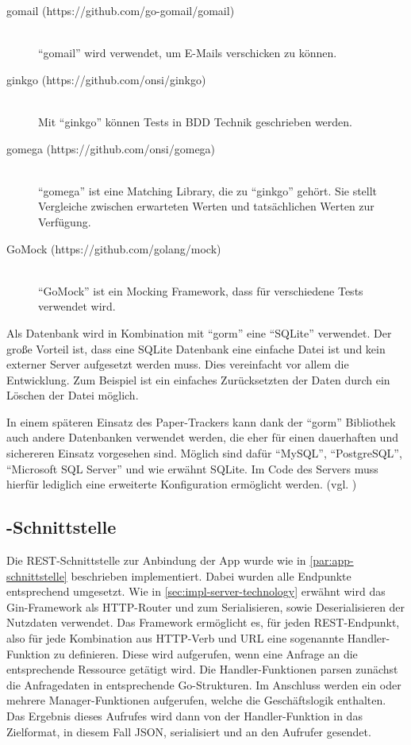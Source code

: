 \begin{description}
	\item[gomail (https://github.com/go-gomail/gomail)] \hfill \\
		\enquote{gomail} wird verwendet, um E-Mails verschicken zu können.
	\item[ginkgo (https://github.com/onsi/ginkgo)] \hfill \\
		Mit \enquote{ginkgo} können Tests in \gls{BDD} Technik geschrieben werden.
	\item[gomega (https://github.com/onsi/gomega)] \hfill \\
		\enquote{gomega} ist eine Matching Library, die zu \enquote{ginkgo} gehört. Sie stellt Vergleiche zwischen erwarteten Werten und tatsächlichen Werten zur Verfügung.
	\item[GoMock (https://github.com/golang/mock)] \hfill \\
		\enquote{GoMock} ist ein Mocking Framework, dass für verschiedene Tests verwendet wird.
\end{description}

Als Datenbank wird in Kombination mit \enquote{gorm} eine \enquote{SQLite} verwendet.
Der große Vorteil ist, dass eine SQLite Datenbank eine einfache Datei ist und kein externer Server aufgesetzt werden muss.
Dies vereinfacht vor allem die Entwicklung.
Zum Beispiel ist ein einfaches Zurücksetzten der Daten durch ein Löschen der Datei möglich.

In einem späteren Einsatz des Paper-Trackers kann dank der \enquote{gorm} Bibliothek auch andere Datenbanken verwendet werden, die eher für einen dauerhaften und sichereren Einsatz vorgesehen sind.
Möglich sind dafür \enquote{MySQL}, \enquote{PostgreSQL}, \enquote{Microsoft SQL Server} und wie erwähnt SQLite.
Im Code des Servers muss hierfür lediglich eine erweiterte Konfiguration ermöglicht werden. (vgl. \cite{Jinzhu2020})

\subsection{-Schnittstelle}

Die \gls{REST}-Schnittstelle zur Anbindung der App wurde wie in \autoref{par:app-schnittstelle}
beschrieben implementiert.
Dabei wurden alle Endpunkte entsprechend umgesetzt.
Wie in \autoref{sec:impl-server-technology} erwähnt wird das Gin-Framework als
\gls{HTTP}-Router und zum Serialisieren, sowie Deserialisieren der Nutzdaten verwendet.
Das Framework ermöglicht es, für jeden \gls{REST}-Endpunkt, also für jede Kombination aus
\gls{HTTP}-Verb und \gls{URL} eine sogenannte Handler-Funktion zu definieren. Diese wird aufgerufen,
wenn eine Anfrage an die entsprechende Ressource getätigt wird. Die Handler-Funktionen parsen
zunächst die Anfragedaten in entsprechende Go-Strukturen. Im Anschluss werden ein oder mehrere
Manager-Funktionen aufgerufen, welche die Geschäftslogik enthalten. Das Ergebnis dieses Aufrufes
wird dann von der Handler-Funktion in das Zielformat, in diesem Fall \gls{JSON}, serialisiert und an
den Aufrufer gesendet.

